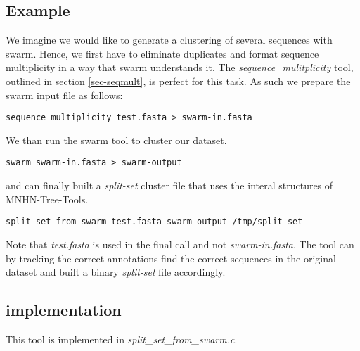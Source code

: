 \subsection{Example}
We imagine we would like to generate a clustering of
several sequences with swarm. Hence, we first have to eliminate duplicates
and format sequence multiplicity in a way that swarm understands it. The
\emph{sequence\_mulitplicity} tool, outlined in section
\ref{sec-seqmult}, is perfect for this task. As such we prepare the
swarm input file as follows:
\begin{lstlisting}
sequence_multiplicity test.fasta > swarm-in.fasta
\end{lstlisting}
We than run the swarm tool to cluster our dataset.
\begin{lstlisting}
swarm swarm-in.fasta > swarm-output
\end{lstlisting}
and can finally built a \emph{split-set} cluster file that uses the interal
structures of MNHN-Tree-Tools.
\begin{lstlisting}
split_set_from_swarm test.fasta swarm-output /tmp/split-set
\end{lstlisting}
Note that \emph{test.fasta} is used in the final call and not
\emph{swarm-in.fasta}. The tool can by tracking the correct
annotations find the correct sequences in the original dataset and
built a binary \emph{split-set} file accordingly.

\subsection{implementation}
This tool is implemented in \emph{split\_set\_from\_swarm.c}.
